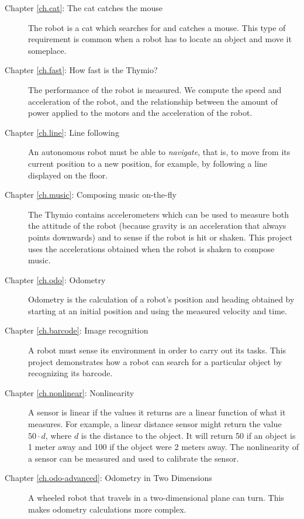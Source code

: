 \begin{description}

\item[Chapter \ref{ch.cat}: The cat catches the mouse] The robot is a
cat which searches for and catches a mouse. This type of requirement is
common when a robot has to locate an object and move it someplace.

\item[Chapter \ref{ch.fast}: How fast is the Thymio?] The
performance of the robot is measured. We compute the speed and
acceleration of the robot, and the relationship between the amount of
power applied to the motors and the acceleration of the robot.

\item[Chapter \ref{ch.line}: Line following] An autonomous robot must be
able to \emph{navigate}, that is, to move from its current position to a
new position, for example, by following a line displayed on the floor.

\item[Chapter \ref{ch.music}: Composing music on-the-fly] The Thymio
contains accelerometers which can be used to measure both the
attitude of the robot (because gravity is an acceleration that always
points downwards) and to sense if the robot is hit or shaken. This
project uses the accelerations obtained when the robot is shaken to
compose music.

\item[Chapter \ref{ch.odo}: Odometry] Odometry is the calculation of
a robot's position and heading obtained by starting at an initial
position and using the measured velocity and time.

\item[Chapter \ref{ch.barcode}: Image recognition] A robot must sense
its environment in order to carry out its tasks. This project
demonstrates how a robot can search for a particular object by
recognizing its barcode.

\item[Chapter \ref{ch.nonlinear}: Nonlinearity] A sensor is linear
if the values it returns are a linear function of what it measures. For
example, a linear distance sensor might return the value $50\cdot d$,
where $d$ is the distance to the object. It will return 50 if an object
is 1 meter away and 100 if the object were 2 meters away. The
nonlinearity of a sensor can be measured and used to calibrate the
sensor.

\item[Chapter \ref{ch.odo-advanced}: Odometry in Two Dimensions] A
wheeled robot that travels in a two-dimensional plane can turn. This
makes odometry calculations more complex.


\end{description}
